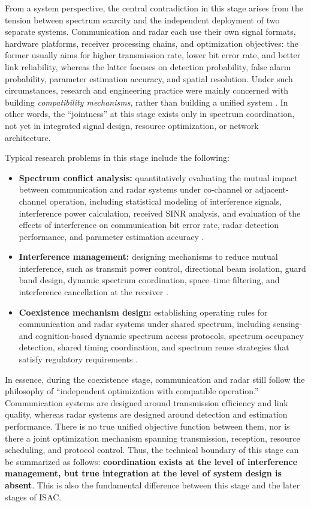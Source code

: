 From a system perspective, the central contradiction in this stage arises from the tension between spectrum scarcity and the independent deployment of two separate systems. Communication and radar each use their own signal formats, hardware platforms, receiver processing chains, and optimization objectives: the former usually aims for higher transmission rate, lower bit error rate, and better link reliability, whereas the latter focuses on detection probability, false alarm probability, parameter estimation accuracy, and spatial resolution. Under such circumstances, research and engineering practice were mainly concerned with building \emph{compatibility mechanisms}, rather than building a unified system \cite{ITU_R_RR2024}. In other words, the ``jointness'' at this stage exists only in spectrum coordination, not yet in integrated signal design, resource optimization, or network architecture.

Typical research problems in this stage include the following:
\begin{itemize}
    \item \textbf{Spectrum conflict analysis:} quantitatively evaluating the mutual impact between communication and radar systems under co-channel or adjacent-channel operation, including statistical modeling of interference signals, interference power calculation, received SINR analysis, and evaluation of the effects of interference on communication bit error rate, radar detection performance, and parameter estimation accuracy \cite{Chiriyath2017RadarCommCoexistence}.
    
    \item \textbf{Interference management:} designing mechanisms to reduce mutual interference, such as transmit power control, directional beam isolation, guard band design, dynamic spectrum coordination, space--time filtering, and interference cancellation at the receiver \cite{Liu2020JointRadarComm}.
    
    \item \textbf{Coexistence mechanism design:} establishing operating rules for communication and radar systems under shared spectrum, including sensing- and cognition-based dynamic spectrum access protocols, spectrum occupancy detection, shared timing coordination, and spectrum reuse strategies that satisfy regulatory requirements \cite{Chiriyath2017RadarCommCoexistence}.
\end{itemize}

In essence, during the coexistence stage, communication and radar still follow the philosophy of ``independent optimization with compatible operation.'' Communication systems are designed around transmission efficiency and link quality, whereas radar systems are designed around detection and estimation performance. There is no true unified objective function between them, nor is there a joint optimization mechanism spanning transmission, reception, resource scheduling, and protocol control. Thus, the technical boundary of this stage can be summarized as follows: \textbf{coordination exists at the level of interference management, but true integration at the level of system design is absent}. This is also the fundamental difference between this stage and the later stages of ISAC.

